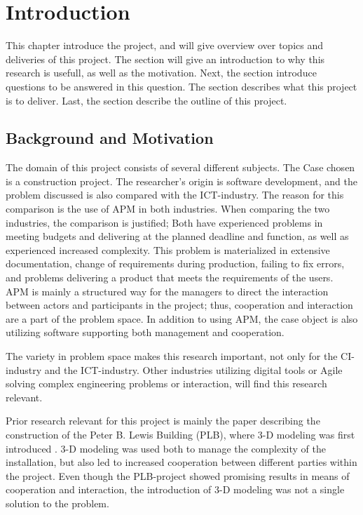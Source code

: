 \chapter{Introduction}

This chapter introduce the project, and will give overview over topics and deliveries of this project. The  section will give an introduction to why this research is usefull, as well as the motivation. Next, the  section introduce questions to be answered in this question. The  section describes what this project is to deliver. Last, the  section describe the outline of this project.

\section{Background and Motivation} \label{sec:background}

The domain of this project consists of several different subjects. The Case chosen is a construction project. The researcher's origin is software development, and the problem discussed is also compared with the ICT-industry. The reason for this comparison is the use of APM in both industries. When comparing the two industries, the comparison is justified; Both have experienced problems in meeting budgets and delivering at the planned deadline and function, as well as experienced increased complexity. This problem is materialized in extensive documentation, change of requirements during production, failing to fix errors, and problems delivering a product that meets the requirements of the users. APM is mainly a structured way for the managers to direct the interaction between actors and participants in the project; thus, cooperation and interaction are a part of the problem space. In addition to using APM, the case object is also utilizing software supporting both management and cooperation. 

The variety in problem space makes this research important, not only for the CI-industry and the ICT-industry. Other industries utilizing digital tools or Agile solving complex engineering problems or interaction, will find this research relevant. 

Prior research relevant for this project is mainly the paper describing the construction of the Peter B. Lewis Building (PLB), where 3-D modeling was first introduced \cite{frank_gehry}. 3-D modeling was used both to manage the complexity of the installation, but also led to increased cooperation between different parties within the project. Even though the PLB-project showed promising results in means of cooperation and interaction, the introduction of 3-D modeling was not a single solution to the problem. 

